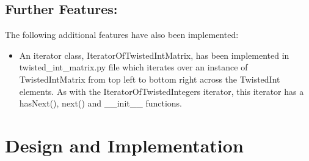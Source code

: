 \documentclass[11]{article}
\begin{document}
	\subsection{Further Features:}
		The following additional features have also been implemented:
		\begin{itemize}
			\item An iterator class, IteratorOfTwistedIntMatrix, has been implemented in twisted\_int\_matrix.py file which iterates over an instance of TwistedIntMatrix from top left to bottom right across the TwistedInt elements. As with the IteratorOfTwistedIntegers iterator, this iterator has a hasNext(), next() and \_\_init\_\_ functions.
		\end{itemize}

	\section{Design and Implementation}
\end{document}
